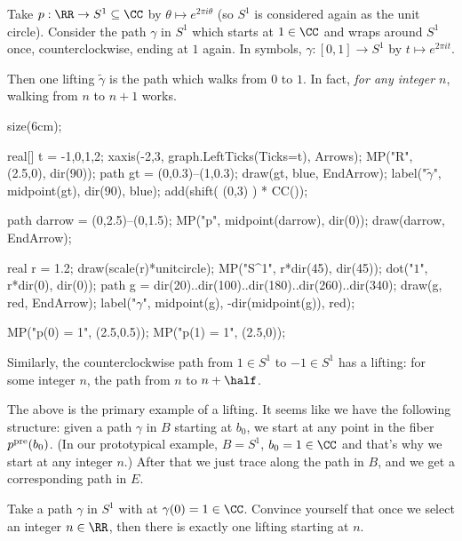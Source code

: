 \begin{example}
	Take $p : \RR \to S^1 \subseteq \CC$ by $\theta \mapsto e^{2 \pi i \theta}$
	(so $S^1$ is considered again as the unit circle).
	Consider the path $\gamma$ in $S^1$ which starts at $1 \in \CC$
	and wraps around $S^1$ once, counterclockwise, ending at $1$ again.
	In symbols, $\gamma : [0,1] \to S^1$ by $t \mapsto e^{2\pi i t}$.

	Then one lifting $\tilde\gamma$ is the path which walks from $0$ to $1$.
	In fact, \emph{for any integer $n$}, walking from $n$ to $n+1$ works.

	\begin{center}
		\begin{asy}
			size(6cm);

			real[] t = {-1,0,1,2};
			xaxis(-2,3, graph.LeftTicks(Ticks=t), Arrows); 
			MP("\mathbb R", (2.5,0), dir(90));
			path gt = (0,0.3)--(1,0.3);
			draw(gt, blue, EndArrow);
			label("$\tilde\gamma$", midpoint(gt), dir(90), blue);
			add(shift( (0,3) ) * CC());

			path darrow = (0,2.5)--(0,1.5);
			MP("p", midpoint(darrow), dir(0));
			draw(darrow, EndArrow);

			real r = 1.2;
			draw(scale(r)*unitcircle);
			MP("S^1", r*dir(45), dir(45));
			dot("$1$", r*dir(0), dir(0));
			path g = dir(20)..dir(100)..dir(180)..dir(260)..dir(340);
			draw(g, red, EndArrow);
			label("$\gamma$", midpoint(g), -dir(midpoint(g)), red);

			MP("p(0) = 1", (2.5,0.5));
			MP("p(1) = 1", (2.5,0));
		\end{asy}
	\end{center}

	Similarly, the counterclockwise path from $1 \in S^1$ to $-1 \in S^1$
	has a lifting: for some integer $n$, the path from $n$ to $n+\half$.
	\label{example:lifting_circle}
\end{example}

The above is the primary example of a lifting.
It seems like we have the following structure: given a path $\gamma$
in $B$ starting at $b_0$, we start at any point in the fiber $p^{\text{pre}}(b_0)$.
(In our prototypical example, $B = S^1$, $b_0 = 1 \in \CC$
and that's why we start at any integer $n$.)
After that we just trace along the path in $B$, and we get
a corresponding path in $E$.
\begin{ques}
	Take a path $\gamma$ in $S^1$ with at $\gamma(0) = 1 \in \CC$.
	Convince yourself that once we select an integer $n \in \RR$,
	then there is exactly one lifting starting at $n$.
\end{ques}


